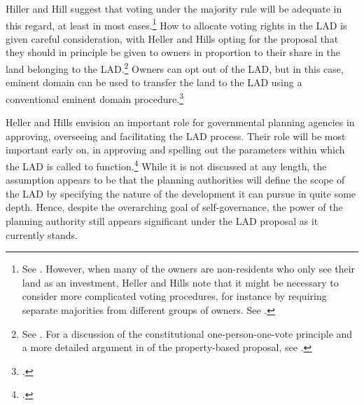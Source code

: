 Hiller and Hill suggest that voting under the majority rule will be adequate in this regard, at least in most cases.\footnote{See \cite[1496]{heller08}. However, when many of the owners are non-residents who only see their land as an investment, Heller and Hills note that it might be necessary to consider more complicated voting procedures, for instance by requiring separate majorities from different groups of owners. See \cite[1523-1524]{heller08}.} How to allocate voting rights in the LAD is given careful consideration, with Heller and Hills opting for the proposal that they should in principle be given to owners in proportion to their share in the land belonging to the LAD.\footnote{See \cite[1492]{heller08}. For a discussion of the constitutional one-person-one-vote principle and a more detailed argument in  of the property-based proposal, see \cite[1503-1507]{heller08}.} Owners can opt out of the LAD, but in this case, eminent domain can be used to transfer the land to the LAD using a conventional eminent domain procedure.\footcite[1496]{heller08}

Heller and Hills envision an important role for governmental planning agencies in approving, overseeing and facilitating the LAD process. Their role will be most important early on, in approving and spelling out the parameters within which the LAD is called to function.\footcite[1489-1491]{heller08} While it is not discussed at any length, the assumption appears to be that the planning authorities will define the scope of the LAD by specifying the nature of the development it can pursue in quite some depth. Hence, despite the overarching goal of self-governance, the power of the planning authority still appears significant under the LAD proposal as it currently stands.

